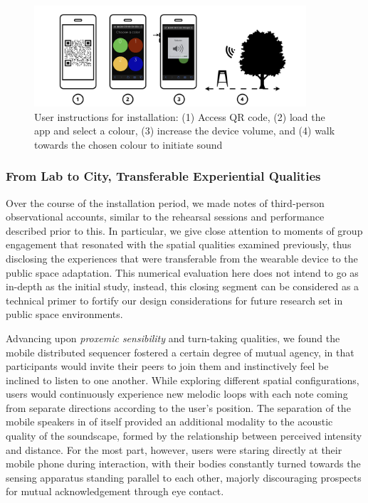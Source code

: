 \begin{figure}[!h]
\centering
\includegraphics[width=0.9\textwidth,keepaspectratio]{Chapters/Figures/adse_ess/ADSE-WP-INSTRUCTIONS.png}
{
\caption[User instructions for installation]{User instructions for installation: (1) Access QR code, (2) load the app and select a colour, (3) increase the device volume, and (4) walk towards the chosen colour to initiate sound}
\label{fig:installation_instructions}
}
\end{figure}

\subsubsection{From Lab to City, Transferable Experiential Qualities}
\label{sec:fromLabToCity}

Over the course of the installation period, we made notes of third-person observational accounts, similar to the rehearsal sessions and performance described prior to this. In particular, we give close attention to moments of group engagement that resonated with the spatial qualities examined previously, thus disclosing the experiences that were transferable from the wearable device to the public space adaptation. This numerical evaluation here does not intend to go as in-depth as the initial study, instead, this closing segment can be considered as a technical primer to fortify our design considerations for future research set in public space environments.

Advancing upon \textit{proxemic sensibility} and turn-taking qualities, we found the mobile distributed sequencer fostered a certain degree of mutual agency, in that participants would invite their peers to join them and instinctively feel be inclined to listen to one another. While exploring different spatial configurations, users would continuously experience new melodic loops with each note coming from separate directions according to the user's position. The separation of the mobile speakers in of itself provided an additional modality to the acoustic quality of the soundscape, formed by the relationship between perceived intensity and distance. For the most part, however, users were staring directly at their mobile phone during interaction, with their bodies constantly turned towards the sensing apparatus standing parallel to each other, majorly discouraging prospects for mutual acknowledgement through eye contact.

